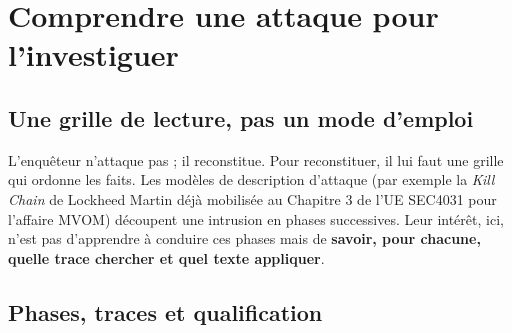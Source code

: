 \section{Comprendre une attaque pour l'investiguer}

\subsection{Une grille de lecture, pas un mode d'emploi}

L'enquêteur n'attaque pas ; il reconstitue. Pour reconstituer, il lui faut une grille qui ordonne les faits. Les modèles de description d'attaque (par exemple la \emph{Kill Chain} de Lockheed Martin déjà mobilisée au Chapitre 3 de l'UE SEC4031 pour l'affaire MVOM) découpent une intrusion en phases successives. Leur intérêt, ici, n'est pas d'apprendre à conduire ces phases mais de \textbf{savoir, pour chacune, quelle trace chercher et quel texte appliquer}.

\subsection{Phases, traces et qualification}


